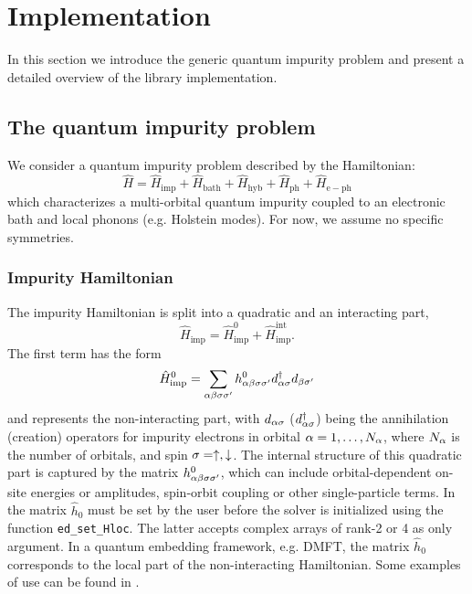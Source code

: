 \documentclass[edipack_sp.tex]{subfiles}
\begin{document}
\section{Implementation}\label{SecEDIpack}
In this section we introduce the generic quantum impurity problem and
present a detailed overview of the \NAME library implementation. 




\subsection{The quantum impurity problem}\label{sSecQIM}
We consider a quantum impurity problem described by the Hamiltonian:
$$
\hat{H} = \hat{H}_\mathrm{imp} + \hat{H}_\mathrm{bath} + \hat{H}_\mathrm{hyb} + \hat{H}_\mathrm{ph} + \hat{H}_\mathrm{e-ph}
$$
which characterizes a multi-orbital quantum impurity
coupled to an electronic bath and local phonons (e.g. Holstein
modes). For now, we assume no specific symmetries.

\subsubsection{Impurity Hamiltonian}
The impurity Hamiltonian is split into a quadratic and an 
interacting part,
\begin{equation}\label{Himp}
  \hat{H}_\mathrm{imp}  = \hat{H}^0_\mathrm{imp} + \hat{H}^\mathrm{int}_\mathrm{imp}.
\end{equation}
The first term has the form
\begin{equation}\label{H0imp}
  \hat{H}^0_\mathrm{imp}  =
  \sum_{\alpha\beta\sigma\sigma'}h^{0}_{\alpha\beta\sigma\sigma'}d^\dagger_{\alpha\sigma}d_{\beta\sigma'}
\end{equation}
and represents the non-interacting part, with $d_{\alpha\sigma}$ ($d^\dagger_{\alpha\sigma}$) being the annihilation (creation)
operators for impurity electrons in 
orbital $\alpha=1,\dots,N_\alpha$, where $N_\alpha$ is the number of orbitals,
and spin $\sigma=\uparrow,\downarrow$.
The internal structure of this quadratic part is captured by the 
matrix $h^{0}_{\alpha\beta\sigma\sigma'}$, which can include 
orbital-dependent on-site energies or amplitudes, spin-orbit coupling or other single-particle terms.
In \NAME the matrix $\hat{h}_0$ must be set by the user before the solver is initialized using the function {\tt ed\_set\_Hloc}. The latter  accepts complex arrays of rank-2 or 4 as only argument. In a quantum embedding framework, e.g. DMFT, the matrix $\hat{h}_0$ corresponds to the local part of the non-interacting Hamiltonian. Some examples of use can be found in  .
\end{document}
